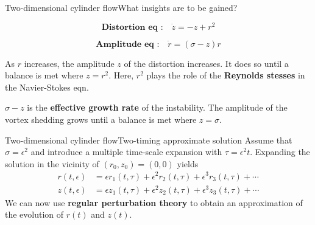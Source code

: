 \documentclass[usenames,dvipsnames,svgnames,10pt,aspectratio=169]{beamer}
\begin{document}





\begin{frame}[t, c]{Two-dimensional cylinder flow}{What insights are to be gained?}
  \begin{minipage}{.48\textwidth}
    \[
    \textbf{Distortion eq :} \quad \dot{z} = -z + r^2
    \]
  \end{minipage}%
  \hfill
  \begin{minipage}{.48\textwidth}
    \[
    \textbf{Amplitude eq :} \quad \dot{r} = \left( \sigma - z \right) r
    \]
  \end{minipage}

  \bigskip

  \begin{minipage}{.48\textwidth}
    As $r$ increases, the amplitude $z$ of the distortion increases.
    It does so until a balance is met where $z = r^2$.
    Here, $r^2$ plays the role of the \alert{\textbf{Reynolds stesses}} in the Navier-Stokes eqn.
  \end{minipage}%
  \hfill
  \begin{minipage}{.48\textwidth}
    $\sigma - z$ is the \alert{\textbf{effective growth rate}} of the instability.
    The amplitude of the vortex shedding grows until a balance is met where $z = \sigma$.
    \vspace{0.5cm}
  \end{minipage}

\end{frame}







\begin{frame}[t, c]{Two-dimensional cylinder flow}{Two-timing approximate solution}
  Assume that $\sigma = \epsilon^2$ and introduce a multiple time-scale expansion with $\tau = \epsilon^2 t$.
  Expanding the solution in the vicinity of $(r_0, z_0) = (0, 0)$ yields
  \[
  \begin{aligned}
    r(t, \epsilon) & = \epsilon r_1(t, \tau) + \epsilon^2 r_2(t, \tau) + \epsilon^3 r_3(t, \tau) + \cdots \\
    z(t, \epsilon) & = \epsilon z_1(t, \tau) + \epsilon^2 z_2(t, \tau) + \epsilon^3 z_3(t, \tau) + \cdots
  \end{aligned}
  \]
  We can now use \alert{\textbf{regular perturbation theory}} to obtain an approximation of the evolution of $r(t)$ and $z(t)$.
\end{frame}
\end{document}
